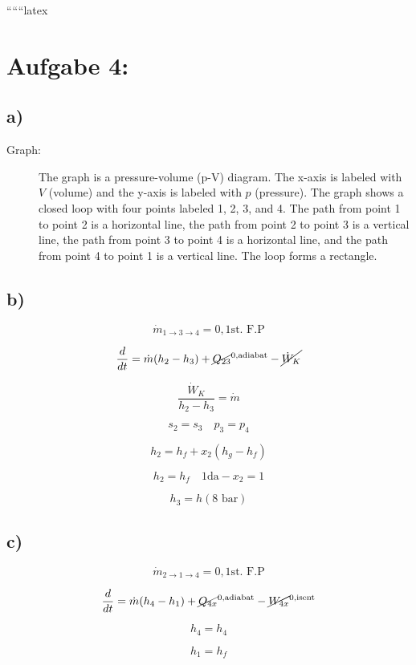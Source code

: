 
``````latex


\section*{Aufgabe 4:}

\subsection*{a)}

\begin{description}
    \item[Graph:] The graph is a pressure-volume (p-V) diagram. The x-axis is labeled with $V$ (volume) and the y-axis is labeled with $p$ (pressure). The graph shows a closed loop with four points labeled 1, 2, 3, and 4. The path from point 1 to point 2 is a horizontal line, the path from point 2 to point 3 is a vertical line, the path from point 3 to point 4 is a horizontal line, and the path from point 4 to point 1 is a vertical line. The loop forms a rectangle.
\end{description}

\subsection*{b)}

\[
\dot{m}_{1 \rightarrow 3 \rightarrow 4} = 0, \text{1st. F.P}
\]

\[
\frac{d}{dt} = \dot{m} (h_2 - h_3) + \cancel{Q_{23}}^{0, \text{adiabat}} - \cancel{\dot{W}_K}
\]

\[
\frac{\dot{W}_K}{h_2 - h_3} = \dot{m}
\]

\[
s_2 = s_3 \quad p_3 = p_4
\]

\[
h_2 = h_f + x_2 (h_g - h_f)
\]

\[
h_2 = h_f \quad 1 \text{da} - x_2 = 1
\]

\[
h_3 = h(8 \text{ bar})
\]

\subsection*{c)}

\[
\dot{m}_{2 \rightarrow 1 \rightarrow 4} = 0, \text{1st. F.P}
\]

\[
\frac{d}{dt} = \dot{m} (h_4 - h_1) + \cancel{Q_{4x}}^{0, \text{adiabat}} - \cancel{W_{4x}}^{0, \text{isent}}
\]

\[
h_4 = h_4
\]

\[
h_1 = h_f
\]

